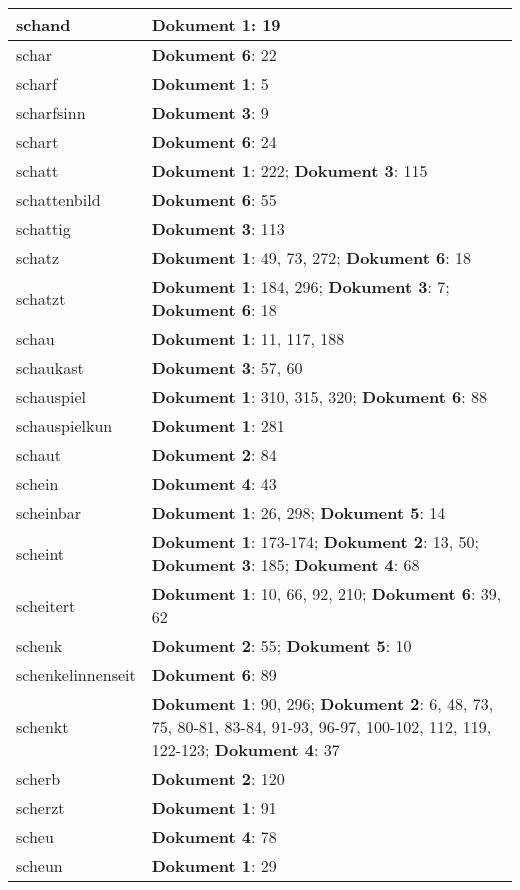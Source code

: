 \documentclass[a5paper]{article}
\begin{document}
\begin{longtable}[l]{|l|p{3in}|}
\hline
schand & \textbf{Dokument 1}: 19 \\
\hline
schar & \textbf{Dokument 6}: 22 \\
\hline
scharf & \textbf{Dokument 1}: 5 \\
\hline
scharfsinn & \textbf{Dokument 3}: 9 \\
\hline
schart & \textbf{Dokument 6}: 24 \\
\hline
schatt & \textbf{Dokument 1}: 222; \textbf{Dokument 3}: 115 \\
\hline
schattenbild & \textbf{Dokument 6}: 55 \\
\hline
schattig & \textbf{Dokument 3}: 113 \\
\hline
schatz & \textbf{Dokument 1}: 49, 73, 272; \textbf{Dokument 6}: 18 \\
\hline
schatzt & \textbf{Dokument 1}: 184, 296; \textbf{Dokument 3}: 7; \textbf{Dokument 6}: 18 \\
\hline
schau & \textbf{Dokument 1}: 11, 117, 188 \\
\hline
schaukast & \textbf{Dokument 3}: 57, 60 \\
\hline
schauspiel & \textbf{Dokument 1}: 310, 315, 320; \textbf{Dokument 6}: 88 \\
\hline
schauspielkun & \textbf{Dokument 1}: 281 \\
\hline
schaut & \textbf{Dokument 2}: 84 \\
\hline
schein & \textbf{Dokument 4}: 43 \\
\hline
scheinbar & \textbf{Dokument 1}: 26, 298; \textbf{Dokument 5}: 14 \\
\hline
scheint & \textbf{Dokument 1}: 173-174; \textbf{Dokument 2}: 13, 50; \textbf{Dokument 3}: 185; \textbf{Dokument 4}: 68 \\
\hline
scheitert & \textbf{Dokument 1}: 10, 66, 92, 210; \textbf{Dokument 6}: 39, 62 \\
\hline
schenk & \textbf{Dokument 2}: 55; \textbf{Dokument 5}: 10 \\
\hline
schenkelinnenseit & \textbf{Dokument 6}: 89 \\
\hline
schenkt & \textbf{Dokument 1}: 90, 296; \textbf{Dokument 2}: 6, 48, 73, 75, 80-81, 83-84, 91-93, 96-97, 100-102, 112, 119, 122-123; \textbf{Dokument 4}: 37 \\
\hline
scherb & \textbf{Dokument 2}: 120 \\
\hline
scherzt & \textbf{Dokument 1}: 91 \\
\hline
scheu & \textbf{Dokument 4}: 78 \\
\hline
scheun & \textbf{Dokument 1}: 29 \\

\end{longtable}
\end{document}
